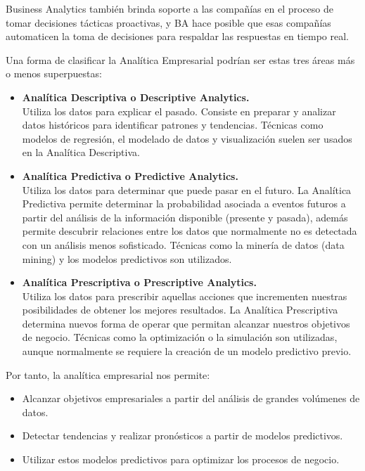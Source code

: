 Business Analytics también brinda soporte a las compañías en el proceso de tomar decisiones tácticas proactivas, y BA hace posible que esas compañías automaticen la toma de decisiones para respaldar las respuestas en tiempo real.\newline

Una forma de clasificar la Analítica Empresarial podrían ser estas tres áreas más o menos superpuestas:

\begin{itemize}
\item \textbf{Analítica Descriptiva o Descriptive Analytics.}\\ Utiliza los datos para explicar el pasado. Consiste en preparar y analizar datos históricos para identificar patrones y tendencias. Técnicas como modelos de regresión, el modelado de datos y visualización suelen ser usados en la Analítica Descriptiva.
\item \textbf{Analítica Predictiva o Predictive Analytics.}\\ Utiliza los datos para determinar que puede pasar en el futuro. La Analítica Predictiva permite determinar la probabilidad asociada a eventos futuros a partir del análisis de la información disponible (presente y pasada), además permite descubrir relaciones entre los datos que normalmente no es detectada con un análisis menos sofisticado. Técnicas como la minería de datos (data mining) y los modelos predictivos son utilizados.
\item \textbf{Analítica Prescriptiva o Prescriptive Analytics.}\\ Utiliza los datos para prescribir aquellas acciones que incrementen nuestras posibilidades de obtener los mejores resultados. La Analítica Prescriptiva determina nuevos forma de operar que permitan alcanzar nuestros objetivos de negocio. Técnicas como la optimización o la simulación son utilizadas, aunque normalmente se requiere la creación de un modelo predictivo previo.
\end{itemize}

Por tanto, la analítica empresarial nos permite:

\begin{itemize}
\item Alcanzar objetivos empresariales a partir del análisis de grandes volúmenes de datos.
\item Detectar tendencias y realizar pronósticos a partir de modelos predictivos.
\item Utilizar estos modelos predictivos para optimizar los procesos de negocio.
\end{itemize}



